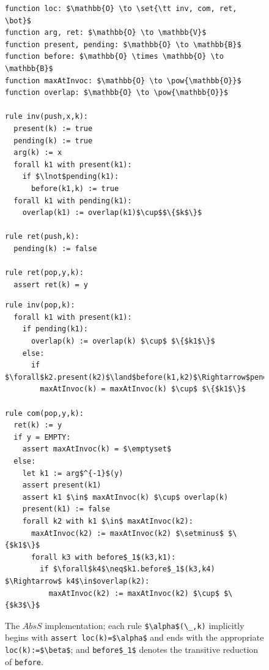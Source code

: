 \begin{figure}[t]
  \begin{minipage}[t]{0.39\linewidth}
    \begin{lstlisting}
function loc: $\mathbb{O} \to \set{\tt inv, com, ret, \bot}$
function arg, ret: $\mathbb{O} \to \mathbb{V}$
function present, pending: $\mathbb{O} \to \mathbb{B}$
function before: $\mathbb{O} \times \mathbb{O} \to \mathbb{B}$
function maxAtInvoc: $\mathbb{O} \to \pow{\mathbb{O}}$
function overlap: $\mathbb{O} \to \pow{\mathbb{O}}$

rule inv(push,x,k):
  present(k) := true
  pending(k) := true
  arg(k) := x
  forall k1 with present(k1):
    if $\lnot$pending(k1):
      before(k1,k) := true
  forall k1 with pending(k1):
    overlap(k1) := overlap(k1)$\cup$$\{$k$\}$

rule ret(push,k):
  pending(k) := false

rule ret(pop,y,k):
  assert ret(k) = y
    \end{lstlisting}
  \end{minipage}
  \begin{minipage}[t]{0.59\linewidth}
    \begin{lstlisting}
rule inv(pop,k):
  forall k1 with present(k1):
    if pending(k1):
      overlap(k) := overlap(k) $\cup$ $\{$k1$\}$
    else:
      if $\forall$k2.present(k2)$\land$before(k1,k2)$\Rightarrow$pending(k2):
        maxAtInvoc(k) = maxAtInvoc(k) $\cup$ $\{$k1$\}$

rule com(pop,y,k):
  ret(k) := y
  if y = EMPTY:
    assert maxAtInvoc(k) = $\emptyset$
  else:
    let k1 := arg$^{-1}$(y)
    assert present(k1)
    assert k1 $\in$ maxAtInvoc(k) $\cup$ overlap(k)
    present(k1) := false
    forall k2 with k1 $\in$ maxAtInvoc(k2):
      maxAtInvoc(k2) := maxAtInvoc(k2) $\setminus$ $\{$k1$\}$
      forall k3 with before$_1$(k3,k1):
        if $\forall$k4$\neq$k1.before$_1$(k3,k4) $\Rightarrow$ k4$\in$overlap(k2):
          maxAtInvoc(k2) := maxAtInvoc(k2) $\cup$ $\{$k3$\}$
    \end{lstlisting}
  \end{minipage}
  \caption{The $AbsS$ implementation; each rule \lstinline|$\alpha$(\_,k)|
  implicitly begins with \lstinline|assert loc(k)=$\alpha$| and ends with the
  appropriate \lstinline|loc(k):=$\beta$|; and \lstinline|before$_1$| denotes
  the transitive reduction of \lstinline|before|.}
  \label{fig:transitions:AbsS}
\end{figure}

